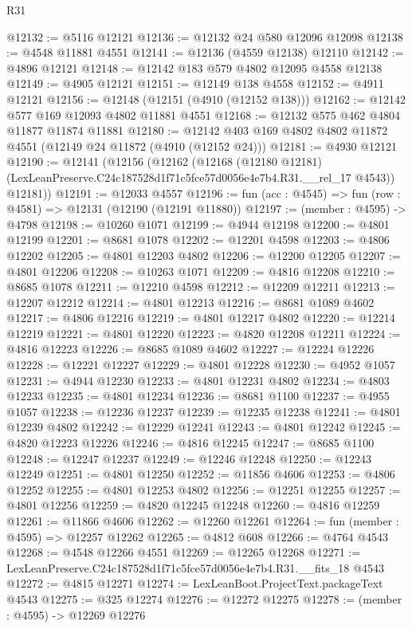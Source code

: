 \begin{lexlean}{R31}
\begin{coremodule}
@12132 := @5116 @12121
@12136 := @12132 @24 @580 @12096 @12098
@12138 := @4548 @11881 @4551
@12141 := @12136 (@4559 @12138) @12110
@12142 := @4896 @12121
@12148 := @12142 @183 @579 @4802 @12095 @4558 @12138
@12149 := @4905 @12121
@12151 := @12149 @138 @4558
@12152 := @4911 @12121
@12156 := @12148 (@12151 (@4910 (@12152 @138)))
@12162 := @12142 @577 @169 @12093 @4802 @11881 @4551
@12168 := @12132 @575 @462 @4804 @11877 @11874 @11881
@12180 := @12142 @403 @169 @4802 @4802 @11872 @4551 (@12149 @24 @11872 (@4910 (@12152 @24)))
@12181 := @4930 @12121
@12190 := @12141
    (@12156
      (@12162
        (@12168
          (@12180 @12181)
          (LexLeanPreserve.C24c187528d1f71c5fce57d0056e4e7b4.R31.__rel_17 @4543))
        @12181))
@12191 := @12033 @4557
@12196 := fun (acc : @4545) => fun (row : @4581) => @12131 (@12190 (@12191 @11880))
@12197 := (member : @4595) -> @4798
@12198 := @10260 @1071
@12199 := @4944 @12198
@12200 := @4801 @12199
@12201 := @8681 @1078
@12202 := @12201 @4598
@12203 := @4806 @12202
@12205 := @4801 @12203 @4802
@12206 := @12200 @12205
@12207 := @4801 @12206
@12208 := @10263 @1071
@12209 := @4816 @12208
@12210 := @8685 @1078
@12211 := @12210 @4598
@12212 := @12209 @12211
@12213 := @12207 @12212
@12214 := @4801 @12213
@12216 := @8681 @1089 @4602
@12217 := @4806 @12216
@12219 := @4801 @12217 @4802
@12220 := @12214 @12219
@12221 := @4801 @12220
@12223 := @4820 @12208 @12211
@12224 := @4816 @12223
@12226 := @8685 @1089 @4602
@12227 := @12224 @12226
@12228 := @12221 @12227
@12229 := @4801 @12228
@12230 := @4952 @1057
@12231 := @4944 @12230
@12233 := @4801 @12231 @4802
@12234 := @4803 @12233
@12235 := @4801 @12234
@12236 := @8681 @1100
@12237 := @4955 @1057
@12238 := @12236 @12237
@12239 := @12235 @12238
@12241 := @4801 @12239 @4802
@12242 := @12229 @12241
@12243 := @4801 @12242
@12245 := @4820 @12223 @12226
@12246 := @4816 @12245
@12247 := @8685 @1100
@12248 := @12247 @12237
@12249 := @12246 @12248
@12250 := @12243 @12249
@12251 := @4801 @12250
@12252 := @11856 @4606
@12253 := @4806 @12252
@12255 := @4801 @12253 @4802
@12256 := @12251 @12255
@12257 := @4801 @12256
@12259 := @4820 @12245 @12248
@12260 := @4816 @12259
@12261 := @11866 @4606
@12262 := @12260 @12261
@12264 := fun (member : @4595) => @12257 @12262
@12265 := @4812 @608
@12266 := @4764 @4543
@12268 := @4548 @12266 @4551
@12269 := @12265 @12268
@12271 := LexLeanPreserve.C24c187528d1f71c5fce57d0056e4e7b4.R31.__fits_18 @4543
@12272 := @4815 @12271
@12274 := LexLeanBoot.ProjectText.packageText @4543
@12275 := @325 @12274
@12276 := @12272 @12275
@12278 := (member : @4595) -> @12269 @12276

\end{coremodule}
\end{lexlean}
